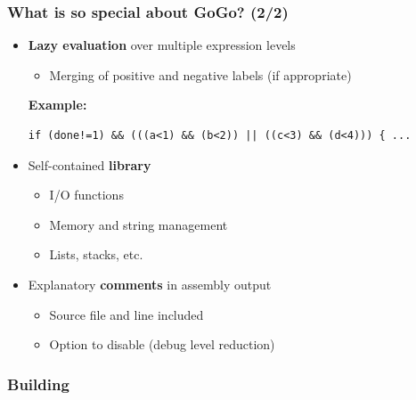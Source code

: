 \documentclass{beamer}
\begin{document}
\begin{frame}[containsverbatim]
    \frametitle{What is so special about GoGo? (2/2)}
    \begin{itemize}
        \item \textbf{Lazy evaluation} over multiple expression levels\\
            \begin{itemize}
                \item Merging of positive and negative labels (if appropriate)
            \end{itemize} 
            \tiny \textbf{Example:} \normalsize
            \begin{lstlisting}
if (done!=1) && (((a<1) && (b<2)) || ((c<3) && (d<4))) { ...
            \end{lstlisting}
        \item Self-contained \textbf{library}
            \begin{itemize}
                \item I/O functions
                \item Memory and string management
                \item Lists, stacks, etc.
            \end{itemize}
        \item  Explanatory \textbf{comments} in assembly output\\
            \begin{itemize}
                \item Source file and line included
                \item Option to disable (debug level reduction)
            \end{itemize}
    \end{itemize}
\end{frame}

\begin{frame}
    \frametitle{Building}
\end{frame}

\end{document}

